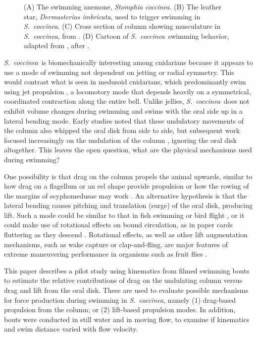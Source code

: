 \documentclass[10pt]{article}
\newcommand{\Genus}[1]{\emph{#1}}
\newcommand{\Stomphiacoccinea}{\Genus{Stomphia coccinea}}
\newcommand{\Stomphia}{\Genus{S.~coccinea}}
\newcommand{\Dermasteriasimbricata}{\Genus{Dermasterias imbricata}}
\begin{document}
\begin{figure}
\caption{(A) The swimming anemone, \Stomphiacoccinea.  (B) The leather star, 
\Dermasteriasimbricata, used to trigger swimming in \Stomphia.  (C) Cross section of 
column showing musculature in \Stomphia, from \citep{Robson:1961}.  (D) Cartoon of \Stomphia\ swimming behavior, adapted from \citep{Sund:1958}, after \citep{Robson:1961}. }
\label{fig:1}
\end{figure}

\Stomphia\ is biomechanically interesting among cnidarians because it appears to use a mode of swimming not dependent on jetting or radial symmetry.  This would contrast what is seen in medusoid cnidarians, which predominantly swim using jet propulsion \citep{Daniel:1982, Daniel:1985, McHenry:2003}, a locomotory mode that depends heavily on a symmetrical, coordinated contraction along the entire bell.  Unlike jellies, \Stomphia\ does not exhibit volume changes during swimming and swims with the oral side up in a lateral bending mode.  Early studies \citep{Yentsch:1955, Sund:1958} noted that these undulatory movements of the column also whipped the oral disk from side to side, but subsequent work focused increasingly on the undulation of the column \citep{Robson:1961, Lawn:1976}, ignoring the oral disk altogether.  This leaves the open question, what are the physical mechanisms used during swimming?  
	
One possibility is that drag on the column propels the animal upwards, similar to how drag on a flagellum or an eel shape provide propulsion \citep{Gray:1955} or how the rowing of the margins of scyphomedusae may work \citep{McHenry:2003}.  An alternative hypothesis is that the lateral bending causes pitching and translation (surge) of the oral disk, producing lift.  Such a mode could be similar to that in fish swimming or bird flight \citep{Vogel:2003, Taylor:2003}, or it could make use of rotational effects on bound circulation, as in paper cards fluttering as they descend \citep{Mahadevan:1999, Pesavento:2004, Andersen:2005, Andersen:2005a}.  Rotational effects, as well as other lift augmentation mechanisms, such as wake capture or clap-and-fling, are major features of extreme maneuvering performance in organisms such as fruit flies \citep{Dickinson:1996}.  
	
This paper describes a pilot study using kinematics from filmed swimming bouts to estimate the relative contributions of drag on the undulating column versus drag and lift from the oral disk.  These are used to evaluate possible mechanisms for force production during swimming in \Stomphia, namely (1) drag-based propulsion from the column;  or (2) lift-based propulsion modes.  In addition, bouts were conducted in still water and in moving flow, to examine if kinematics and swim distance varied with flow velocity.   
\end{document}
